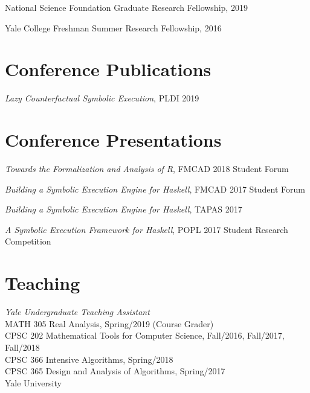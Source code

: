\documentclass[margin]{res}
\begin{document}
\begin{resume}
National Science Foundation Graduate Research Fellowship, 2019

Yale College Freshman Summer Research Fellowship, 2016


\section{Conference Publications}
\textit{Lazy Counterfactual Symbolic Execution}, PLDI 2019


\section{Conference Presentations}
\textit{Towards the Formalization and Analysis of R},
  FMCAD 2018 Student Forum

\textit{Building a Symbolic Execution Engine for Haskell},
  FMCAD 2017 Student Forum

\textit{Building a Symbolic Execution Engine for Haskell},
  TAPAS 2017

\textit{A Symbolic Execution Framework for Haskell},
  POPL 2017 Student Research Competition


\section{Teaching}
\textit{Yale Undergraduate Teaching Assistant} \\
    {MATH 305 Real Analysis, Spring/2019 (Course Grader)} \\
    {CPSC 202 Mathematical Tools for Computer Science, Fall/2016, Fall/2017, Fall/2018} \\
    {CPSC 366 Intensive Algorithms, Spring/2018} \\
    {CPSC 365 Design and Analysis of Algorithms, Spring/2017} \\
Yale University


\end{resume}
\end{document}
